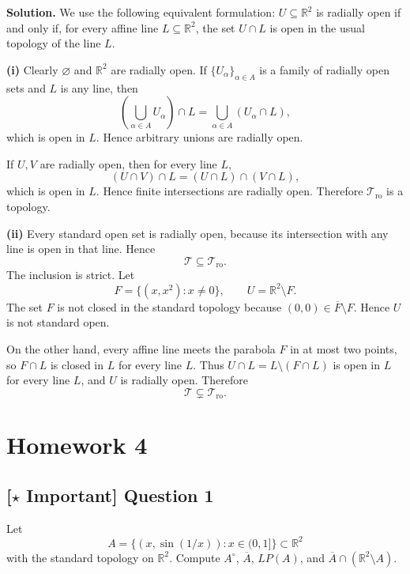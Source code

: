 \documentclass{article}
\newcommand{\R}{\mathbb{R}}
\newcommand{\important}{\texorpdfstring{\textbf{[\(\star\) Important]}}{[Important]}}
\newenvironment{solution}{\par\noindent\textbf{Solution.}\quad}{\par}
\begin{document}
\begin{solution}
We use the following equivalent formulation: $U\subseteq\R^2$ is radially
open if and only if, for every affine line $L\subseteq\R^2$, the set
$U\cap L$ is open in the usual topology of the line $L$.

\textbf{(i)} Clearly $\varnothing$ and $\R^2$ are radially open. If
$\{U_\alpha\}_{\alpha\in A}$ is a family of radially open sets and $L$ is
any line, then
\[
  \left(\bigcup_{\alpha\in A}U_\alpha\right)\cap L
  =\bigcup_{\alpha\in A}(U_\alpha\cap L),
\]
which is open in $L$. Hence arbitrary unions are radially open.

If $U,V$ are radially open, then for every line $L$,
\[
  (U\cap V)\cap L=(U\cap L)\cap(V\cap L),
\]
which is open in $L$. Hence finite intersections are radially open.
Therefore $\mathcal T_{\mathrm{ro}}$ is a topology.

\textbf{(ii)} Every standard open set is radially open, because its
intersection with any line is open in that line. Hence
\[
  \mathcal T\subseteq\mathcal T_{\mathrm{ro}}.
\]
The inclusion is strict. Let
\[
  F=\{(x,x^2):x\ne0\},\qquad U=\R^2\setminus F.
\]
The set $F$ is not closed in the standard topology because
$(0,0)\in\overline F\setminus F$. Hence $U$ is not standard open.

On the other hand, every affine line meets the parabola $F$ in at most two
points, so $F\cap L$ is closed in $L$ for every line $L$. Thus
$U\cap L=L\setminus(F\cap L)$ is open in $L$ for every line $L$, and $U$
is radially open. Therefore
\[
  \mathcal T\subsetneq\mathcal T_{\mathrm{ro}}.
\]
\end{solution}


\section{Homework 4}



\subsection{\important{} Question 1}

Let
\[
A=\{(x,\sin(1/x)):x\in(0,1]\}\subset\R^2
\]
with the standard topology on $\R^2$. Compute $A^{\circ}$, $\overline{A}$, $LP(A)$, and $\overline{A}\cap(\R^2\setminus A)$.
\end{document}
